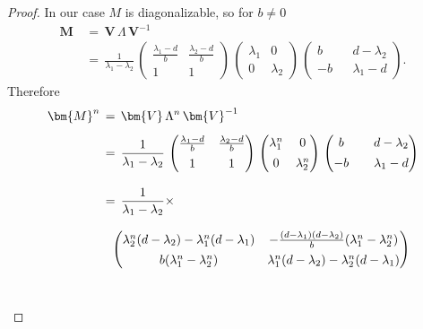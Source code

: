 \documentclass{article}
\theoremstyle{example}
\theoremstyle{plain}
\theoremstyle{definition}
\theoremstyle{remark}
\def\mM{{\bm{M}}}
\def\mV{{\bm{V}}}
\begin{document}
\begin{proof}
In our case $M$ is diagonalizable, so for $b\neq 0$
\begin{align}\nonumber
\mM & \, = \, \mV \, \Lambda \, \mV^{-1}
%
\\[1ex]
&\, = \, 
\frac{1}{\lambda_1-\lambda_2}
\,
\begin{pmatrix}
\frac{\lambda_1 -d}{b} & \frac{\lambda_2 -d}{b} \\[1ex]
1 & 1
\end{pmatrix}
\, 
\begin{pmatrix}
\lambda_1 & 0 \\[1ex]
0 & \lambda_2
\end{pmatrix}
\,
\begin{pmatrix}
b & & d-\lambda_2 \\[1ex]
-b & & \lambda_1-d 
\end{pmatrix}.
%
\end{align}
Therefore
\begingroup
\allowdisplaybreaks
\begin{align}\nonumber
%
\mM^n &\, = \, \mV \, \Lambda^n \, \mV^{-1}  
%
\\[1ex]\nonumber
& \, = \,
\frac{1}{\lambda_1-\lambda_2}
\,
\begin{pmatrix}
\frac{\lambda_1 -d}{b} & \frac{\lambda_2 -d}{b} \\[1ex]
1 & 1
\end{pmatrix}
\, 
\begin{pmatrix}
\lambda_1^n & 0 \\[1ex]
0 & \lambda_2^n
\end{pmatrix}
\,
\begin{pmatrix}
b & & d-\lambda_2 \\[1ex]
-b & & \lambda_1-d 
\end{pmatrix} 
%
\\[2ex]\nonumber
%
& \, = \, \frac{1}{\lambda_1-\lambda_2} \times
%
\\[2ex]\nonumber
%
&
\hspace{.3cm} \begin{pmatrix}
\lambda_2^n(d - \lambda_2)- \lambda_1^n(d - \lambda_1) & -\frac{(d - \lambda_1)(d - \lambda_2)}{b} (\lambda_1^n - \lambda_2^n)\\[1ex]
%
b (\lambda_1^n - \lambda_2^n)  &\lambda_1^n(d - \lambda_2) - \lambda_2^n(d-\lambda_1)
\end{pmatrix}
%
\\[2ex]\nonumber

\end{align}
\end{proof}
\end{document}
